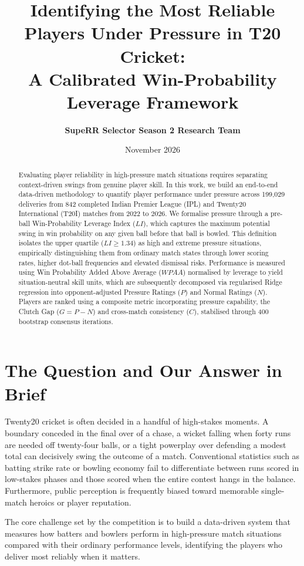 \documentclass[11pt,a4paper]{article}
\title{\textbf{Identifying the Most Reliable Players Under Pressure in T20 Cricket:\\A Calibrated Win-Probability Leverage Framework}}
\author{\textbf{SupeRR Selector Season 2 Research Team}}
\date{November 2026}
\begin{document}
\maketitle

\begin{abstract}
Evaluating player reliability in high-pressure match situations requires separating context-driven swings from genuine player skill. In this work, we build an end-to-end data-driven methodology to quantify player performance under pressure across 199,029 deliveries from 842 completed Indian Premier League (IPL) and Twenty20 International (T20I) matches from 2022 to 2026. We formalise pressure through a pre-ball Win-Probability Leverage Index ($LI$), which captures the maximum potential swing in win probability on any given ball before that ball is bowled. This definition isolates the upper quartile ($LI \ge 1.34$) as high and extreme pressure situations, empirically distinguishing them from ordinary match states through lower scoring rates, higher dot-ball frequencies and elevated dismissal risks. Performance is measured using Win Probability Added Above Average ($WPAA$) normalised by leverage to yield situation-neutral skill units, which are subsequently decomposed via regularised Ridge regression into opponent-adjusted Pressure Ratings ($P$) and Normal Ratings ($N$). Players are ranked using a composite metric incorporating pressure capability, the Clutch Gap ($G = P - N$) and cross-match consistency ($C$), stabilised through 400 bootstrap consensus iterations.
\end{abstract}

\section{The Question and Our Answer in Brief}
\label{sec:introduction}

Twenty20 cricket is often decided in a handful of high-stakes moments. A boundary conceded in the final over of a chase, a wicket falling when forty runs are needed off twenty-four balls, or a tight powerplay over defending a modest total can decisively swing the outcome of a match. Conventional statistics such as batting strike rate or bowling economy fail to differentiate between runs scored in low-stakes phases and those scored when the entire contest hangs in the balance. Furthermore, public perception is frequently biased toward memorable single-match heroics or player reputation.

The core challenge set by the competition is to build a data-driven system that measures how batters and bowlers perform in high-pressure match situations compared with their ordinary performance levels, identifying the players who deliver most reliably when it matters. 
\end{document}
